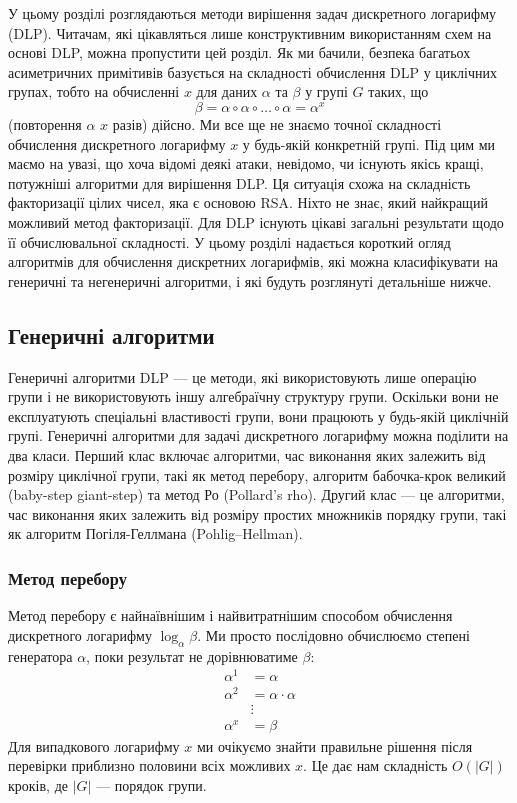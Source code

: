 \documentclass[12pt]{report}
\theoremstyle{definition}
\theoremstyle{plain}
\begin{document}
У цьому розділі розглядаються методи вирішення задач дискретного логарифму (DLP). Читачам, які цікавляться лише конструктивним використанням схем на основі DLP, можна пропустити цей розділ. Як ми бачили, безпека багатьох асиметричних примітивів базується на складності обчислення DLP у циклічних групах, тобто на обчисленні \( x \) для даних \( \alpha \) та \( \beta \) у групі \( G \) таких, що
\[
\beta = \alpha \circ \alpha \circ \ldots \circ \alpha = \alpha^x
\]
(повторення \( \alpha \) \( x \) разів)
дійсно. Ми все ще не знаємо точної складності обчислення дискретного логарифму \( x \) у будь-якій конкретній групі. Під цим ми маємо на увазі, що хоча відомі деякі атаки, невідомо, чи існують якісь кращі, потужніші алгоритми для вирішення DLP. Ця ситуація схожа на складність факторизації цілих чисел, яка є основою RSA. Ніхто не знає, який найкращий можливий метод факторизації. Для DLP існують цікаві загальні результати щодо її обчислювальної складності. У цьому розділі надається короткий огляд алгоритмів для обчислення дискретних логарифмів, які можна класифікувати на генеричні та негенеричні алгоритми, і які будуть розглянуті детальніше нижче.

\subsection{Генеричні алгоритми}

Генеричні алгоритми DLP — це методи, які використовують лише операцію групи і не використовують іншу алгебраїчну структуру групи. Оскільки вони не експлуатують спеціальні властивості групи, вони працюють у будь-якій циклічній групі. Генеричні алгоритми для задачі дискретного логарифму можна поділити на два класи. Перший клас включає алгоритми, час виконання яких залежить від розміру циклічної групи, такі як метод перебору, алгоритм бабочка-крок великий (baby-step giant-step) та метод Ро (Pollard’s rho). Другий клас — це алгоритми, час виконання яких залежить від розміру простих множників порядку групи, такі як алгоритм Погіля-Геллмана (Pohlig–Hellman).

\subsubsection{Метод перебору}

Метод перебору є найнаївнішим і найвитратнішим способом обчислення дискретного логарифму \( \log_\alpha \beta \). Ми просто послідовно обчислюємо степені генератора \( \alpha \), поки результат не дорівнюватиме \( \beta \):
\[
\begin{aligned}
\alpha^1 & = \alpha \\
\alpha^2 & = \alpha \cdot \alpha \\
& \vdots \\
\alpha^x & = \beta
\end{aligned}
\]
Для випадкового логарифму \( x \) ми очікуємо знайти правильне рішення після перевірки приблизно половини всіх можливих \( x \). Це дає нам складність \( O(|G|) \) кроків, де \( |G| \) — порядок групи.
\end{document}
